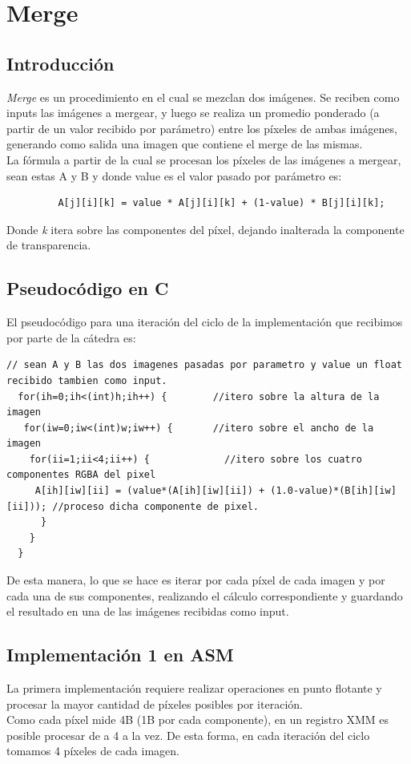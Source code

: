 \section{Merge}
\subsection{Introducción}
\textit{Merge} es un procedimiento en el cual se mezclan dos imágenes. Se reciben como inputs las imágenes a mergear, y luego se realiza un promedio ponderado (a partir de un valor recibido por parámetro) entre los píxeles de ambas imágenes, generando como salida una imagen que contiene el merge de las mismas.\\
La fórmula a partir de la cual se procesan los píxeles de las imágenes a mergear, sean estas A y B y donde value es el valor pasado por parámetro es:  

\begin{verbatim}
         A[j][i][k] = value * A[j][i][k] + (1-value) * B[j][i][k];
\end{verbatim}

Donde \textit{k} itera sobre las componentes del píxel, dejando inalterada la componente de transparencia.

\subsection{Pseudocódigo en C}

El pseudocódigo para una iteración del ciclo de la implementación que recibimos por parte de la cátedra es:

\begin{lstlisting}
// sean A y B las dos imagenes pasadas por parametro y value un float recibido tambien como input.
  for(ih=0;ih<(int)h;ih++) {		//itero sobre la altura de la imagen
   for(iw=0;iw<(int)w;iw++) {		//itero sobre el ancho de la imagen
    for(ii=1;ii<4;ii++) {			  //itero sobre los cuatro componentes RGBA del pixel
     A[ih][iw][ii] = (value*(A[ih][iw][ii]) + (1.0-value)*(B[ih][iw][ii])); //proceso dicha componente de pixel.
      }
    }
  }

\end{lstlisting}

De esta manera, lo que se hace es iterar por cada píxel de cada imagen y por cada una de sus componentes, realizando el cálculo correspondiente y guardando el resultado en una de las imágenes recibidas como input.

\subsection{Implementación 1 en ASM}
La primera implementación requiere realizar operaciones en punto flotante y procesar la mayor cantidad de píxeles posibles por iteración.\\
Como cada píxel mide 4B (1B por cada componente), en un registro XMM es posible procesar de a 4 a la vez. De esta forma, en cada iteración del ciclo tomamos 4 píxeles de cada imagen.

